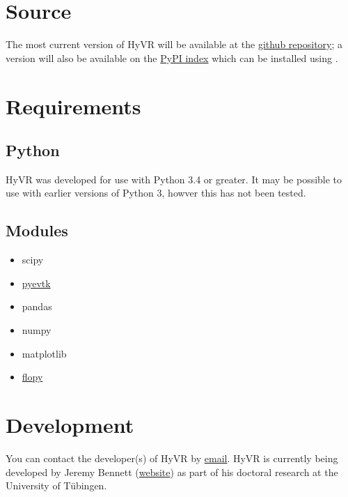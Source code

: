 \documentclass[letterpaper,10pt,english]{sphinxmanual}
\begin{document}
\section{Source}
\label{intro:source}
The most current version of HyVR will be available at the \href{https://github.com/driftingtides/hyvr/}{github repository}; a version will also be available on the \href{https://pypi.python.org/pypi/hyvr/}{PyPI index} which can be installed using .


\section{Requirements}
\label{intro:requirements}

\subsection{Python}
\label{intro:python}
HyVR was developed for use with Python 3.4 or greater. It may be possible to use with earlier versions of Python 3, howver this has not been tested.


\subsection{Modules}
\label{intro:modules}\begin{itemize}
\item {} 
scipy

\item {} 
\href{https://pypi.python.org/pypi/PyEVTK}{pyevtk}

\item {} 
pandas

\item {} 
numpy

\item {} 
matplotlib

\item {} 
\href{https://github.com/modflowpy/flopy}{flopy}

\end{itemize}


\section{Development}
\label{intro:development}
You can contact the developer(s) of HyVR by \href{mailto:hyvr.sim@gmail.com}{email}.  HyVR is currently being developed by Jeremy Bennett (\href{https://jeremypaulbennett.weebly.com}{website}) as part of his doctoral research at the University of Tübingen.
\end{document}
